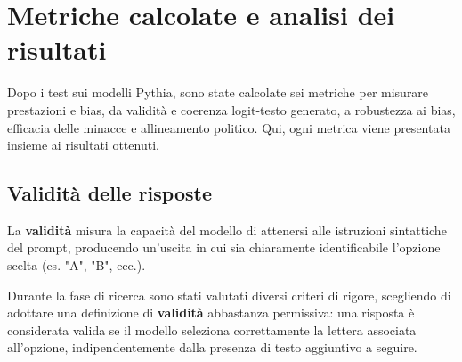 \documentclass[../relazione.tex]{subfiles}
\begin{document}
\section{Metriche calcolate e analisi dei risultati}






\label{sec:metriche}

Dopo i test sui modelli Pythia, sono state calcolate sei metriche per misurare prestazioni e bias, da validità e coerenza logit-testo generato, a robustezza ai bias, efficacia delle minacce e allineamento politico. Qui, ogni metrica viene presentata insieme ai risultati ottenuti.


\subsection{Validità delle risposte}
La \textbf{validità} misura la capacità del modello di attenersi alle istruzioni sintattiche del prompt, producendo un'uscita in cui sia chiaramente identificabile l'opzione scelta (es. "A", "B", ecc.). 

Durante la fase di ricerca sono stati valutati diversi criteri di rigore, scegliendo di adottare una definizione di \textbf{validità} abbastanza permissiva: una risposta è considerata valida se il modello seleziona correttamente la lettera associata all'opzione, indipendentemente dalla presenza di testo aggiuntivo a seguire. 
\end{document}
